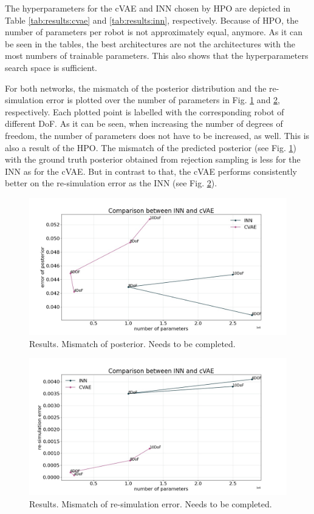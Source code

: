 \documentclass[conference]{IEEEtran}
\begin{document}
The hyperparameters for the cVAE and INN chosen by HPO are depicted in Table \ref{tab:results:cvae} and \ref{tab:results:inn}, respectively. Because of HPO, the number of parameters per robot is not approximately equal, anymore. As it can be seen in the tables, the best architectures are not the architectures with the most numbers of trainable parameters. This also shows that the hyperparameters search space is sufficient. 

For both networks, the mismatch of the posterior distribution and the re-simulation error is plotted over the number of parameters in Fig. \ref{fig:plot:posterior} and \ref{fig:plot:resim}, respectively. Each plotted point is labelled with the corresponding robot of different DoF. As it can be seen, when increasing the number of degrees of freedom, the number of parameters does not have to be increased, as well. This is also a result of the HPO. 
The mismatch of the predicted posterior (see Fig. \ref{fig:plot:posterior}) with the ground truth posterior obtained from rejection sampling is less for the INN as for the cVAE. But in contrast to that, the cVAE performs consistently better on the re-simulation error as the INN (see Fig. \ref{fig:plot:resim}).

\begin{figure}[!ht]
\centering
	\includegraphics[width=\linewidth]{figures/comparison_e_posterior_alternative.jpg}
    \caption{\label{fig:plot:posterior} Results. Mismatch of posterior. Needs to be completed.}
\end{figure}

\begin{figure}[!ht]
\centering
	\includegraphics[width=\linewidth]{figures/comparison_e_resim_alternative.jpg}
    \caption{\label{fig:plot:resim} Results. Mismatch of re-simulation error. Needs to be completed.}
\end{figure}
\end{document}
